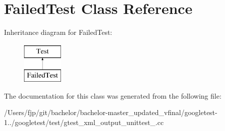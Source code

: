 \hypertarget{class_failed_test}{}\section{Failed\+Test Class Reference}
\label{class_failed_test}
Inheritance diagram for Failed\+Test\+:\begin{figure}[H]
\begin{center}
\leavevmode
\includegraphics[height=2.000000cm]{class_failed_test}
\end{center}
\end{figure}


The documentation for this class was generated from the following file\+:\begin{DoxyCompactItemize}
\item 
/\+Users/fjp/git/bachelor/bachelor-\/master\+\_\+updated\+\_\+vfinal/googletest-\/1../googletest/test/gtest\+\_\+xml\+\_\+output\+\_\+unittest\+\_\+.\+cc\end{DoxyCompactItemize}
